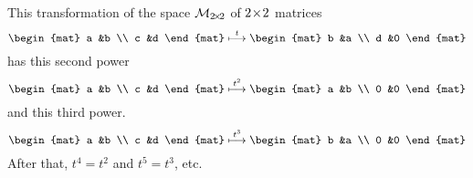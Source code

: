 \begin{example}
This transformation of the space $\mathcal{M}_{2 \! \times \! 2}$ of $2 \! \times \! 2$ matrices
\begin{equation*}
  \begin{mat}
    a  &b  \\
    c  &d
  \end{mat}
  \mapsunder{t}
  \begin{mat}
    b  &a  \\
    d  &0
  \end{mat}
\end{equation*}
has this second power
\begin{equation*}
  \begin{mat}
    a  &b  \\
    c  &d
  \end{mat}
  \mapsunder{t^2}
  \begin{mat}
    a  &b  \\
    0  &0
  \end{mat}
\end{equation*}
and this third power.
\begin{equation*}
  \begin{mat}
    a  &b  \\
    c  &d
  \end{mat}
  \mapsunder{t^3}
  \begin{mat}
    b  &a  \\
    0  &0
  \end{mat}
\end{equation*}
After that, $t^4=t^2$ and $t^5=t^3$, etc.
\end{example}

